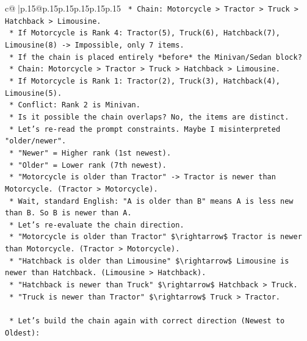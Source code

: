 \documentclass{article}
\begin{document}
{\begin{supertabular}{c@{$\;$}|p{.15\linewidth}@{}p{.15\linewidth}p{.15\linewidth}p{.15\linewidth}p{.15\linewidth}p{.15\linewidth}}
{{{\texttt{                *   Chain: Motorcycle > Tractor > Truck > Hatchback > Limousine.} \\
\texttt{                *   If Motorcycle is Rank 4: Tractor(5), Truck(6), Hatchback(7), Limousine(8) {-}> Impossible, only 7 items.} \\
\texttt{            *   If the chain is placed entirely *before* the Minivan/Sedan block?} \\
\texttt{                *   Chain: Motorcycle > Tractor > Truck > Hatchback > Limousine.} \\
\texttt{                *   If Motorcycle is Rank 1: Tractor(2), Truck(3), Hatchback(4), Limousine(5).} \\
\texttt{                *   Conflict: Rank 2 is Minivan.} \\
\texttt{            *   Is it possible the chain overlaps? No, the items are distinct.} \\
\texttt{            *   Let's re{-}read the prompt constraints. Maybe I misinterpreted "older/newer".} \\
\texttt{                *   "Newer" = Higher rank (1st newest).} \\
\texttt{                *   "Older" = Lower rank (7th newest).} \\
\texttt{                *   "Motorcycle is older than Tractor" {-}> Tractor is newer than Motorcycle. (Tractor > Motorcycle).} \\
\texttt{                *   Wait, standard English: "A is older than B" means A is less new than B. So B is newer than A.} \\
\texttt{                *   Let's re{-}evaluate the chain direction.} \\
\texttt{                *   "Motorcycle is older than Tractor" \$\textbackslash{}rightarrow\$ Tractor is newer than Motorcycle. (Tractor > Motorcycle).} \\
\texttt{                *   "Hatchback is older than Limousine" \$\textbackslash{}rightarrow\$ Limousine is newer than Hatchback. (Limousine > Hatchback).} \\
\texttt{                *   "Hatchback is newer than Truck" \$\textbackslash{}rightarrow\$ Hatchback > Truck.} \\
\texttt{                *   "Truck is newer than Tractor" \$\textbackslash{}rightarrow\$ Truck > Tractor.} \\
\\ 
\texttt{    *   Let's build the chain again with correct direction (Newest to Oldest):} \\
}}}
\end{supertabular}}
\end{document}
